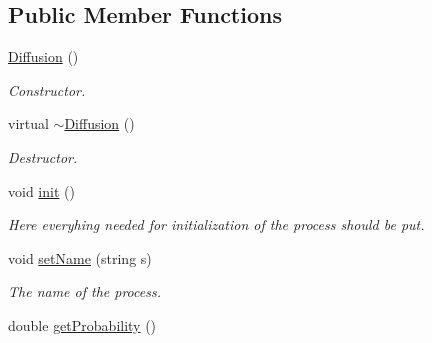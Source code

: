 \subsection*{Public Member Functions}
\begin{DoxyCompactItemize}
\item 
\mbox{\label{classMicroProcesses_1_1Diffusion_ac9ea5351a9030303907c2bf866076aa2}} 
\mbox{\hyperlink{classMicroProcesses_1_1Diffusion_ac9ea5351a9030303907c2bf866076aa2}{Diffusion}} ()
\begin{DoxyCompactList}\small\item\em Constructor. \end{DoxyCompactList}\item 
\mbox{\label{classMicroProcesses_1_1Diffusion_ad8f0097d8ef4e20a5e4c4e6a2bc0c228}} 
virtual \mbox{\hyperlink{classMicroProcesses_1_1Diffusion_ad8f0097d8ef4e20a5e4c4e6a2bc0c228}{$\sim$\+Diffusion}} ()
\begin{DoxyCompactList}\small\item\em Destructor. \end{DoxyCompactList}\item 
\mbox{\label{classMicroProcesses_1_1Diffusion_abdf4a0708fdec9bc6877418afaf51bb5}} 
void \mbox{\hyperlink{classMicroProcesses_1_1Diffusion_abdf4a0708fdec9bc6877418afaf51bb5}{init}} ()
\begin{DoxyCompactList}\small\item\em Here everyhing needed for initialization of the process should be put. \end{DoxyCompactList}\item 
\mbox{\label{classMicroProcesses_1_1Diffusion_a8828bfcf075bd04443de9e9932fb5eab}} 
void \mbox{\hyperlink{classMicroProcesses_1_1Diffusion_a8828bfcf075bd04443de9e9932fb5eab}{set\+Name}} (string s)
\begin{DoxyCompactList}\small\item\em The name of the process. \end{DoxyCompactList}\item 
\mbox{\label{classMicroProcesses_1_1Diffusion_af483d53a291f3524a273d35d24f7f24c}} 
double \mbox{\hyperlink{classMicroProcesses_1_1Diffusion_af483d53a291f3524a273d35d24f7f24c}{get\+Probability}} ()

\end{DoxyCompactItemize}
